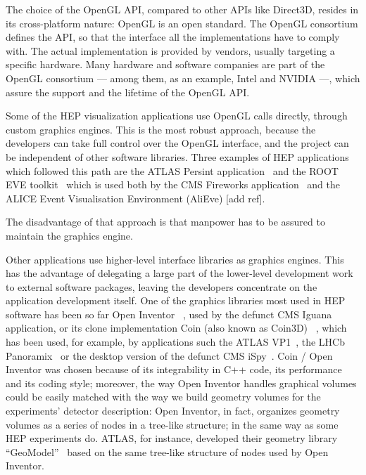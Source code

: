 \documentclass[12pt,a4paper]{article}
\begin{document}
The choice of the OpenGL API, compared to other APIs like Direct3D, resides in its cross-platform nature:
OpenGL is an open standard. The OpenGL consortium defines the API, so that the interface all the implementations have to
comply with. The actual implementation is provided by vendors, usually targeting a specific hardware. Many hardware and
software companies are part of the OpenGL consortium --- among them, as an example, Intel and NVIDIA ---, which assure
the support and the lifetime of the OpenGL API.

Some of the HEP visualization applications use OpenGL calls directly,
through custom graphics engines. This is the most robust approach, because the developers can take full control over the OpenGL interface,
and the project can be independent of other software libraries. Three examples of  HEP applications which followed this path are the
ATLAS Persint application~\cite{ATLASPersint2012} and the ROOT EVE toolkit~\cite{ROOTEVE2007} which is used both by the CMS Fireworks application~\cite{CMSFireworks}
and the ALICE Event Visualisation Environment (AliEve) [add ref].

The disadvantage of that approach is that manpower has to be assured to maintain the graphics engine.

Other applications use higher-level interface libraries as graphics engines. This has the advantage of delegating
a large part of the lower-level development work to external software packages, leaving the developers  concentrate
on the application development itself. One of the graphics libraries most used in HEP software has been so far Open Inventor
~\cite{OpenInventor1993}, used by the defunct CMS Iguana~\cite{CMSIguana} application, or its clone implementation Coin (also known as Coin3D)
~\cite{Coin3D}, which has been used, for example, by applications such the ATLAS VP1~\cite{ATLASVP12010}, the LHCb Panoramix~\cite{LHCbPanoramix}
or the desktop version of the defunct CMS iSpy~\cite{CMSISpy}. Coin / Open Inventor was chosen because of its integrability in C++ code,
its performance and its coding style; moreover, the way Open Inventor handles graphical volumes could be easily matched with
the way we build geometry volumes for the experiments’ detector description: Open Inventor, in fact, organizes geometry volumes
as a series of nodes in a tree-like structure; in the same way as some HEP experiments do. ATLAS, for instance, developed their
geometry library “GeoModel”~\cite{ATLASGeoModel2004} based on the same tree-like structure of nodes used by Open Inventor.
\end{document}
